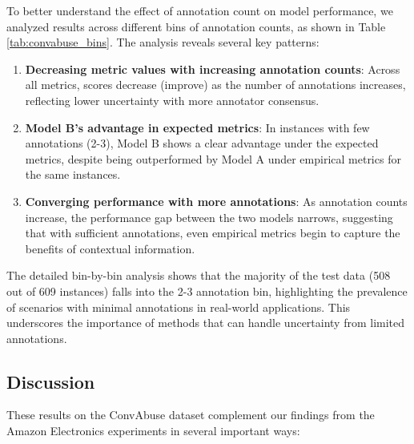 \documentclass[journal]{IEEEtran}
\begin{document}
To better understand the effect of annotation count on model performance, we analyzed results across different bins of annotation counts, as shown in Table \ref{tab:convabuse_bins}. The analysis reveals several key patterns:

\begin{enumerate}
    \item \textbf{Decreasing metric values with increasing annotation counts}: Across all metrics, scores decrease (improve) as the number of annotations increases, reflecting lower uncertainty with more annotator consensus.
    
    \item \textbf{Model B's advantage in expected metrics}: In instances with few annotations (2-3), Model B shows a clear advantage under the expected metrics, despite being outperformed by Model A under empirical metrics for the same instances.
    
    \item \textbf{Converging performance with more annotations}: As annotation counts increase, the performance gap between the two models narrows, suggesting that with sufficient annotations, even empirical metrics begin to capture the benefits of contextual information.
\end{enumerate}

The detailed bin-by-bin analysis shows that the majority of the test data (508 out of 609 instances) falls into the 2-3 annotation bin, highlighting the prevalence of scenarios with minimal annotations in real-world applications. This underscores the importance of methods that can handle uncertainty from limited annotations.

\subsection{Discussion}

These results on the ConvAbuse dataset complement our findings from the Amazon Electronics experiments in several important ways:
\end{document}
